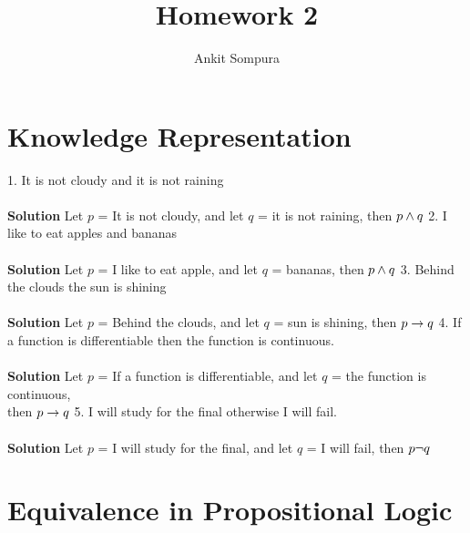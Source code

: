 \documentclass[11pt]{article}
\title{Homework 2}
\author{Ankit Sompura}
\begin{document}
\maketitle

\section{Knowledge Representation}
1. It is not cloudy and it is not raining \\\\
\textbf{Solution}  Let $p$ = It is not cloudy, and let $q$ = it is not raining, then $p \land q \\\\
$
2. I like to eat apples and bananas \\\\
\textbf{Solution} Let $p$ = I like to eat apple, and let $q$ = bananas, then $p \land q \\\\
$
3. Behind the clouds the sun is shining \\\\ 
\textbf{Solution} Let $p$ = Behind the clouds, and let $q$ = sun is shining, then $p \rightarrow q \\\\
$
4.  If a function is differentiable then the function is continuous.\\\\
\textbf{Solution} Let $p$ = If a function is differentiable, and let $q$ = the function is continuous, \\then $p \rightarrow q \\\\
$
5.  I will study for the final otherwise I will fail. \\\\
\textbf{Solution} Let $p$ = I will study for the final, and let $q$ = I will fail, then $p \neg q \\\\
$



\section{Equivalence in Propositional Logic}
\end{document}
